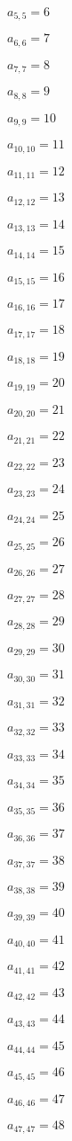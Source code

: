 \documentclass[a4paper,12pt]{article}
\begin{document}
$a _{ 5, 5 } = 6$

$a _{ 6, 6 } = 7$

$a _{ 7, 7 } = 8$

$a _{ 8, 8 } = 9$

$a _{ 9, 9 } = 10$

$a _{ 10, 10 } = 11$

$a _{ 11, 11 } = 12$

$a _{ 12, 12 } = 13$

$a _{ 13, 13 } = 14$

$a _{ 14, 14 } = 15$

$a _{ 15, 15 } = 16$

$a _{ 16, 16 } = 17$

$a _{ 17, 17 } = 18$

$a _{ 18, 18 } = 19$

$a _{ 19, 19 } = 20$

$a _{ 20, 20 } = 21$

$a _{ 21, 21 } = 22$

$a _{ 22, 22 } = 23$

$a _{ 23, 23 } = 24$

$a _{ 24, 24 } = 25$

$a _{ 25, 25 } = 26$

$a _{ 26, 26 } = 27$

$a _{ 27, 27 } = 28$

$a _{ 28, 28 } = 29$

$a _{ 29, 29 } = 30$

$a _{ 30, 30 } = 31$

$a _{ 31, 31 } = 32$

$a _{ 32, 32 } = 33$

$a _{ 33, 33 } = 34$

$a _{ 34, 34 } = 35$

$a _{ 35, 35 } = 36$

$a _{ 36, 36 } = 37$

$a _{ 37, 37 } = 38$

$a _{ 38, 38 } = 39$

$a _{ 39, 39 } = 40$

$a _{ 40, 40 } = 41$

$a _{ 41, 41 } = 42$

$a _{ 42, 42 } = 43$

$a _{ 43, 43 } = 44$

$a _{ 44, 44 } = 45$

$a _{ 45, 45 } = 46$

$a _{ 46, 46 } = 47$

$a _{ 47, 47 } = 48$
\end{document}

